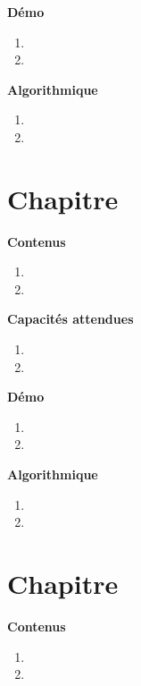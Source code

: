 \documentclass[10pt,a4paper]{article}
\begin{document}
\textbf{Démo}

\begin{enumerate}
\item 
\item 
\end{enumerate}

\textbf{Algorithmique}

\begin{enumerate}
\item 
\item 
\end{enumerate}

\section{Chapitre}

\textbf{Contenus}

\begin{enumerate} 
\item 
\item 
\end{enumerate}


\textbf{Capacités attendues}

\begin{enumerate}
\item 
\item 
\end{enumerate}

\textbf{Démo}

\begin{enumerate}
\item 
\item 
\end{enumerate}

\textbf{Algorithmique}

\begin{enumerate}
\item 
\item 
\end{enumerate}

\section{Chapitre}

\textbf{Contenus}

\begin{enumerate} 
\item 
\item 
\end{enumerate}
\end{document}
